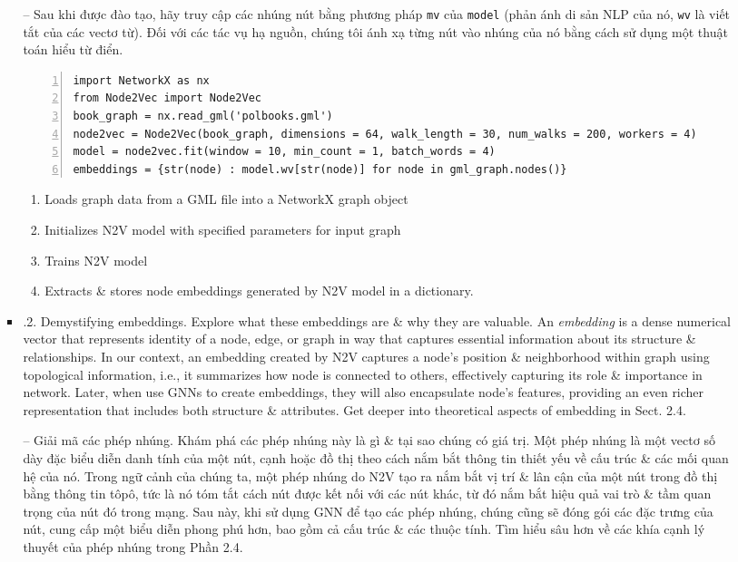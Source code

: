 \documentclass{article}
\begin{document}
\begin{itemize}
\begin{itemize}
\begin{itemize}
           -- Sau khi được đào tạo, hãy truy cập các nhúng nút bằng phương pháp {\tt mv} của {\tt model} (phản ánh di sản NLP của nó, {\tt wv} là viết tắt của các vectơ từ). Đối với các tác vụ hạ nguồn, chúng tôi ánh xạ từng nút vào nhúng của nó bằng cách sử dụng một thuật toán hiểu từ điển.
           \begin{Verbatim}[numbers=left,xleftmargin=5mm]
import NetworkX as nx
from Node2Vec import Node2Vec
book_graph = nx.read_gml('polbooks.gml')
node2vec = Node2Vec(book_graph, dimensions = 64, walk_length = 30, num_walks = 200, workers = 4)
model = node2vec.fit(window = 10, min_count = 1, batch_words = 4)
embeddings = {str(node) : model.wv[str(node)] for node in gml_graph.nodes()}
           \end{Verbatim}
           \begin{enumerate}
               \item Loads graph data from a GML file into a NetworkX graph object
               \item Initializes N2V model with specified parameters for input graph
               \item Trains N2V model
               \item Extracts \& stores node embeddings generated by N2V model in a dictionary.
           \end{enumerate}
           \item {.2. Demystifying embeddings.} Explore what these embeddings are \& why they are valuable. An {\it embedding} is a dense numerical vector that represents identity of a node, edge, or graph in way that captures essential information about its structure \& relationships. In our context, an embedding created by N2V captures a node's position \& neighborhood within graph using topological information, i.e., it summarizes how node is connected to others, effectively capturing its role \& importance in network. Later, when use GNNs to create embeddings, they will also encapsulate node's features, providing an even richer representation that includes both structure \& attributes. Get deeper into theoretical aspects of embedding in Sect. 2.4.

           -- {\sf Giải mã các phép nhúng.} Khám phá các phép nhúng này là gì \& tại sao chúng có giá trị. Một phép nhúng {\it} là một vectơ số dày đặc biểu diễn danh tính của một nút, cạnh hoặc đồ thị theo cách nắm bắt thông tin thiết yếu về cấu trúc \& các mối quan hệ của nó. Trong ngữ cảnh của chúng ta, một phép nhúng do N2V tạo ra nắm bắt vị trí \& lân cận của một nút trong đồ thị bằng thông tin tôpô, tức là nó tóm tắt cách nút được kết nối với các nút khác, từ đó nắm bắt hiệu quả vai trò \& tầm quan trọng của nút đó trong mạng. Sau này, khi sử dụng GNN để tạo các phép nhúng, chúng cũng sẽ đóng gói các đặc trưng của nút, cung cấp một biểu diễn phong phú hơn, bao gồm cả cấu trúc \& các thuộc tính. Tìm hiểu sâu hơn về các khía cạnh lý thuyết của phép nhúng trong Phần 2.4.


\end{itemize}
\end{itemize}
\end{itemize}
\end{document}

